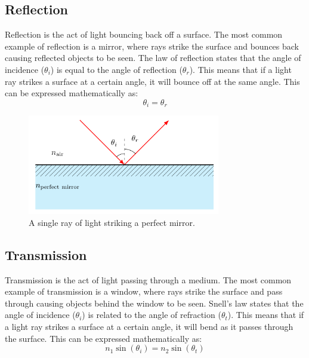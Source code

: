 \subsection{Reflection}
Reflection is the act of light bouncing back off a surface. The most common example of reflection is a mirror, where rays strike the surface and bounces back causing reflected objects to be seen. The law of reflection states that the angle of incidence ($\theta_i$) is equal to the angle of reflection ($\theta_r$). This means that if a light ray strikes a surface at a certain angle, it will bounce off at the same angle. This can be expressed mathematically as:
\begin{equation}
  \theta_i = \theta_r
  \end{equation}

\begin{figure}[H]\label{fig:mirror}
  \centering
  \includegraphics[width=0.75\textwidth]{figures/mirror.pdf}
  \caption{A single ray of light striking a perfect mirror.}
\end{figure}

\subsection{Transmission}
Transmission is the act of light passing through a medium. The most common example of transmission is a window, where rays strike the surface and pass through causing objects behind the window to be seen. Snell's law states that the angle of incidence ($\theta_i$) is related to the angle of refraction ($\theta_t$). This means that if a light ray strikes a surface at a certain angle, it will bend as it passes through the surface. This can be expressed mathematically as:
\begin{equation}
  n_1 \sin(\theta_i) = n_2 \sin(\theta_t)
  \end{equation}

